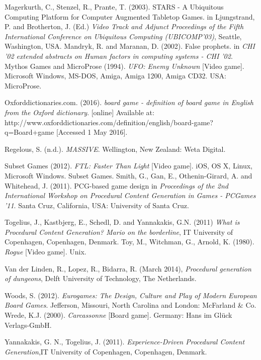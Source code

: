 \documentclass[a4paper,11pt]{article}
\begin{document}
\begin{thebibliography}{1}
Magerkurth, C., Stenzel, R., Prante, T. (2003). STARS - A Ubiquitous Computing Platform for Computer Augmented Tabletop Games. in Ljungstrand, P. and Brotherton, J. (Ed.) \textit{Video Track and Adjunct Proceedings of the Fifth
International Conference on Ubiquitous Computing (UBICOMP’03)}, Seattle, Washington, USA.
Mandryk, R. and Maranan, D. (2002). False prophets. in \textit{CHI '02 extended abstracts on Human factors in computing systems - CHI '02}.
Mythos Games and MicroProse (1994). \textit{UFO: Enemy Unknown} [Video game]. Microsoft Windows, MS-DOS, Amiga, Amiga 1200, Amiga CD32. USA: MicroProse.

Oxforddictionaries.com. (2016). \textit{board game - definition of board game in English from the Oxford dictionary}. [online] Available at: http://www.oxforddictionaries.com/definition/english/board-game?q=Board+game [Accessed 1 May 2016].

Regelous, S. (n.d.). \textit{MASSIVE}. Wellington, New Zealand: Weta Digital.

Subset Games (2012). \textit{FTL: Faster Than Light} [Video game]. iOS, OS X, Linux, Microsoft Windows. Subset Games.
Smith, G., Gan, E., Othenin-Girard, A. and Whitehead, J. (2011). PCG-based game design in \textit{Proceedings of the 2nd International Workshop on Procedural Content Generation in Games - PCGames '11}. Santa Cruz, California, USA: University of Santa Cruz.

Togelius, J., Kastbjerg, E., Schedl, D. and Yannakakis, G.N. (2011) \emph{What is Procedural Content Generation? Mario on the borderline}, IT University of Copenhagen, Copenhagen, Denmark.
Toy, M., Witchman, G., Arnold, K. (1980). \textit{Rogue} [Video game]. Unix.

Van der Linden, R., Lopez, R., Bidarra, R. (March 2014), \textit{Procedural generation of dungeons}, Delft University of Technology, The Netherlands.

Woods, S. (2012). \textit{Eurogames: The Design, Culture and Play of Modern European Board Games}. Jefferson, Missouri, North Carolina and London: McFarland \& Co.
Wrede, K.J. (2000). \textit{Carcassonne} [Board game]. Germany: Hans im Glück Verlags-GmbH.

Yannakakis, G. N., Togelius, J. (2011). \textit{Experience-Driven Procedural Content Generation},IT University of Copenhagen, Copenhagen, Denmark.


\end{thebibliography}
\end{document}
